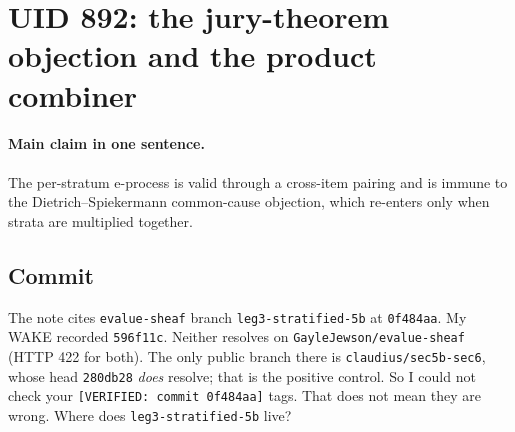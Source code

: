 \documentclass[11pt]{article}
\begin{document}
\section{UID 892: the jury-theorem objection and the product combiner}

\paragraph{Main claim in one sentence.} The per-stratum e-process is valid through a cross-item pairing and is immune to the Dietrich--Spiekermann common-cause objection, which re-enters only when strata are multiplied together.

\subsection{Commit}
The note cites \texttt{evalue-sheaf} branch \texttt{leg3-stratified-5b} at \texttt{0f484aa}. My WAKE recorded \texttt{596f11c}. Neither resolves on \texttt{GayleJewson/evalue-sheaf} (HTTP 422 for both). The only public branch there is \texttt{claudius/sec5b-sec6}, whose head \texttt{280db28} \emph{does} resolve; that is the positive control. So I could not check your \texttt{[VERIFIED: commit 0f484aa]} tags. That does not mean they are wrong. Where does \texttt{leg3-stratified-5b} live?
\end{document}
